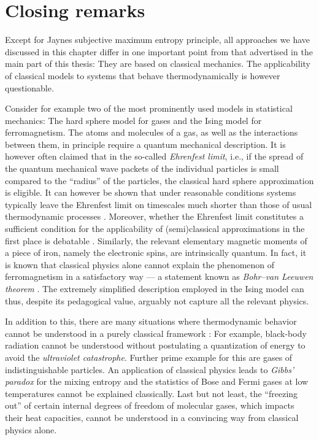 \documentclass[a4paper,12pt,listof=totoc,index=totoc,bibliography=totoc,headsepline=false,headings=normal,BCOR16.153846mm,DIV12,headinclude,twoside,cleardoublepage=empty,numbers=noenddot,final]{scrreprt}
\theoremstyle{mystyle}
\numberwithin{equation}{section}
\numberwithin{figure}{section}
\numberwithin{lemma}{section}
\numberwithin{theorem}{section}
\numberwithin{corollary}{section}
\numberwithin{definition}{section}
\numberwithin{conjecture}{section}
\numberwithin{observation}{section}
\newcommand{\+}{\mkern2mu}
\DeclareMathOperator{\1}{\mathds{1}}
\begin{document}
\section{Closing remarks}
\label{sec:somegeneralcriticalremarks}
%
Except for Jaynes subjective maximum entropy principle, all approaches we have discussed in this chapter differ in one important point from that advertised in the main part of this thesis:
They are based on classical mechanics.
The applicability of classical models to systems that behave thermodynamically is however questionable.

Consider for example two of the most prominently used models in statistical mechanics:
The hard sphere model for gases and the Ising model for ferromagnetism.
The atoms and molecules of a gas, as well as the interactions between them, in principle require a quantum mechanical description.
It is however often claimed that in the so-called \emph{Ehrenfest limit}, i.e., if the spread of the quantum mechanical wave packets of the individual particles is small compared to the ``radius'' of the particles, the classical hard sphere approximation is eligible.
It can however be shown that under reasonable conditions systems typically leave the Ehrenfest limit on timescales much shorter than those of usual thermodynamic processes \cite[Chapter~4]{Gemmer09}.
Moreover, whether the Ehrenfest limit constitutes a sufficient condition for the applicability of (semi)classical approximations in the first place is debatable \cite{Ballentine1994}.
Similarly, the relevant elementary magnetic moments of a piece of iron, namely the electronic spins, are intrinsically quantum.
In fact, it is known that classical physics alone cannot explain the phenomenon of ferromagnetism in a satisfactory way --- a statement known as \emph{Bohr--van Leeuwen theorem} \cite{Bohr1911,Aharoni2000,Nolting2009}.
The extremely simplified description employed in the Ising model can thus, despite its pedagogical value, arguably not capture all the relevant physics.

In addition to this, there are many situations where thermodynamic behavior cannot be understood in a purely classical framework \cite{greiner}:
For example, black-body radiation cannot be understood without postulating a quantization of energy to avoid the \emph{ultraviolet catastrophe}.
Further prime example for this are gases of indistinguishable particles.
An application of classical physics leads to \emph{Gibbs' paradox} for the mixing entropy and the statistics of Bose and Fermi gases at low temperatures cannot be explained classically.
Last but not least, the ``freezing out'' of certain internal degrees of freedom of molecular gases, which impacts their heat capacities, cannot be understood in a convincing way from classical physics alone.
\end{document}
